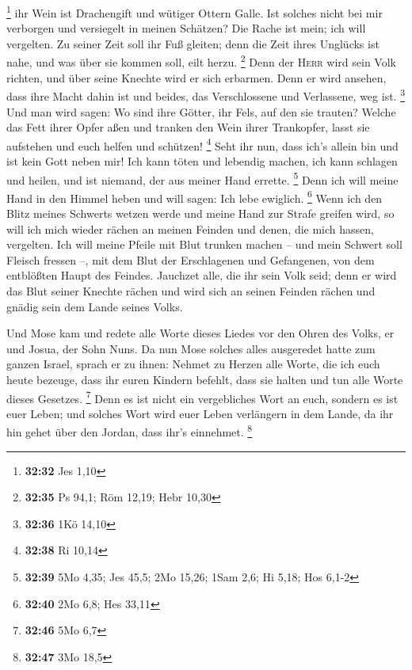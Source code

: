 \footnote{\textbf{32:32} Jes 1,10}  ihr Wein ist
Drachengift und wütiger Ottern Galle.  Ist solches nicht
bei mir verborgen und versiegelt in meinen Schätzen?  Die
Rache ist mein; ich will vergelten. Zu seiner Zeit soll ihr Fuß gleiten;
denn die Zeit ihres Unglücks ist nahe, und was über sie kommen soll,
eilt herzu. \footnote{\textbf{32:35} Ps 94,1; Röm 12,19; Hebr 10,30}
 Denn der \textsc{Herr} wird sein Volk richten, und über
seine Knechte wird er sich erbarmen. Denn er wird ansehen, dass ihre
Macht dahin ist und beides, das Verschlossene und Verlassene, weg ist.
\footnote{\textbf{32:36} 1Kö 14,10}  Und man wird sagen:
Wo sind ihre Götter, ihr Fels, auf den sie trauten? 
Welche das Fett ihrer Opfer aßen und tranken den Wein ihrer Trankopfer,
lasst sie aufstehen und euch helfen und schützen! \footnote{\textbf{32:38}
  Ri 10,14}  Seht ihr nun, dass ich's allein bin und ist
kein Gott neben mir! Ich kann töten und lebendig machen, ich kann
schlagen und heilen, und ist niemand, der aus meiner Hand errette.
\footnote{\textbf{32:39} 5Mo 4,35; Jes 45,5; 2Mo 15,26; 1Sam 2,6; Hi
  5,18; Hos 6,1-2}  Denn ich will meine Hand in den
Himmel heben und will sagen: Ich lebe ewiglich. \footnote{\textbf{32:40}
  2Mo 6,8; Hes 33,11}  Wenn ich den Blitz meines Schwerts
wetzen werde und meine Hand zur Strafe greifen wird, so will ich mich
wieder rächen an meinen Feinden und denen, die mich hassen, vergelten.
 Ich will meine Pfeile mit Blut trunken machen -- und
mein Schwert soll Fleisch fressen --, mit dem Blut der Erschlagenen und
Gefangenen, von dem entblößten Haupt des Feindes. 
Jauchzet alle, die ihr sein Volk seid; denn er wird das Blut seiner
Knechte rächen und wird sich an seinen Feinden rächen und gnädig sein
dem Lande seines Volks.

 Und Mose kam und redete alle Worte dieses Liedes vor den
Ohren des Volks, er und Josua, der Sohn Nuns.  Da nun
Mose solches alles ausgeredet hatte zum ganzen Israel, 
sprach er zu ihnen: Nehmet zu Herzen alle Worte, die ich euch heute
bezeuge, dass ihr euren Kindern befehlt, dass sie halten und tun alle
Worte dieses Gesetzes. \footnote{\textbf{32:46} 5Mo 6,7} 
Denn es ist nicht ein vergebliches Wort an euch, sondern es ist euer
Leben; und solches Wort wird euer Leben verlängern in dem Lande, da ihr
hin gehet über den Jordan, dass ihr's einnehmet. \footnote{\textbf{32:47}
  3Mo 18,5}

